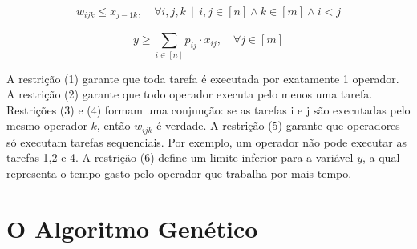 \documentclass{article}
\begin{document}
\begin{equation}
 	w_{ijk} \leq x_{j-1k},  \quad \forall i,j,k \, \mid \, i,j \in [n]  \land k \in [m] \land i < j
\end{equation}

\begin{equation}
 	y \geq \sum_{i \in [n] }^{} p_{ij} \cdot x_{ij},   \quad \forall j \in [m]
\end{equation}

A restrição (1) garante que toda tarefa é executada por exatamente 1 operador. A restrição (2) garante que todo operador executa pelo menos uma tarefa. Restrições (3) e (4) formam uma conjunção: se as tarefas i e j são executadas pelo mesmo operador $k$, então $w_{ijk}$ é verdade. A restrição (5) garante que operadores só executam tarefas sequenciais. Por exemplo, um operador não pode executar as tarefas 1,2 e 4. A restrição (6) define um limite inferior para a variável $y$, a qual representa o tempo gasto pelo operador que trabalha por mais tempo.

\section{O Algoritmo Genético}
\end{document}
